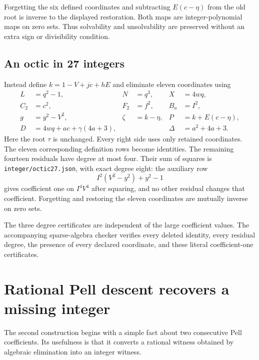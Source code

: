 \documentclass[11pt]{article}
\theoremstyle{remark}\newtheorem{remark}[theorem]{Remark}
\begin{document}
Forgetting the six defined coordinates and subtracting $E(c-\eta)$ from the old root is inverse to the displayed restoration. Both maps are integer-polynomial maps on zero sets. Thus solvability and unsolvability are preserved without an extra sign or divisibility condition.

\subsection{An octic in 27 integers}

Instead define $k=1-V+jc+hE$ and eliminate eleven coordinates using
\begin{align*}
 L&=q^2-1,& N&=q^3,& X&=4wq,\\
 C_2&=c^2,& F_2&=f^2,& B_a&=I^2,\\
 g&=y^2-V^2,& \zeta&=k-\eta,& P&=k+E(c-\eta),\\
 D&=4wq+ac+\gamma(4a+3),&&& \Delta&=a^2+4a+3.
\end{align*}
Here the root $\tau$ is unchanged. Every right side uses only retained coordinates. The eleven corresponding definition rows become identities. The remaining fourteen residuals have degree at most four. Their sum of squares is \texttt{integer/octic27.json}, with exact degree eight: the auxiliary row
\[
 I^2(V^2-y^2)+y^2-1
\]
gives coefficient one on $I^4V^4$ after squaring, and no other residual changes that coefficient. Forgetting and restoring the eleven coordinates are mutually inverse on zero sets.

The three degree certificates are independent of the large coefficient values. The accompanying sparse-algebra checker verifies every deleted identity, every residual degree, the presence of every declared coordinate, and these literal coefficient-one certificates.

\section{Rational Pell descent recovers a missing integer}\label{sec:descent}

The second construction begins with a simple fact about two consecutive Pell coefficients. Its usefulness is that it converts a rational witness obtained by algebraic elimination into an integer witness.
\end{document}
